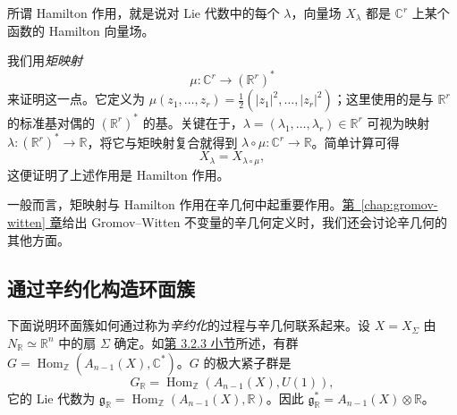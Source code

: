 所谓 Hamilton 作用，就是说对 Lie 代数中的每个 $\lambda$，向量场 $X_\lambda$ 都是 $\mathbb C^r$ 上某个函数的 Hamilton 向量场。

我们用\emph{矩映射}
\[
\mu:\mathbb C^r\longrightarrow(\mathbb R^r)^*
\]
来证明这一点。它定义为
$\mu(z_1,\ldots,z_r)=\tfrac12(|z_1|^2,\ldots,|z_r|^2)$；这里使用的是与 $\mathbb R^r$ 的标准基对偶的 $(\mathbb R^r)^*$ 的基。关键在于，$\lambda=(\lambda_1,\ldots,\lambda_r)\in\mathbb R^r$ 可视为映射 $\lambda:(\mathbb R^r)^*\to\mathbb R$，将它与矩映射复合就得到 $\lambda\circ\mu:\mathbb C^r\to\mathbb R$。简单计算可得
\[
X_\lambda=X_{\lambda\circ\mu},
\]
这便证明了上述作用是 Hamilton 作用。

一般而言，矩映射与 Hamilton 作用在辛几何中起重要作用。\hyperref[chap:gromov-witten]{第~\ref*{chap:gromov-witten} 章}给出 Gromov--Witten 不变量的辛几何定义时，我们还会讨论辛几何的其他方面。

\subsection{通过辛约化构造环面簇}\label{subsec:toric-reduction}

下面说明环面簇如何通过称为\emph{辛约化}的过程与辛几何联系起来。设 $X=X_\Sigma$ 由 $N_{\mathbb R}\simeq\mathbb R^n$ 中的扇 $\Sigma$ 确定。如\hyperref[subsec:toric-from-homogeneous]{第 3.2.3 小节}所述，有群 $G=\operatorname{Hom}_{\mathbb Z}(A_{n-1}(X),\mathbb C^*)$。$G$ 的极大紧子群是
\[
G_{\mathbb R}=\operatorname{Hom}_{\mathbb Z}(A_{n-1}(X),U(1)),
\]
它的 Lie 代数为 $\mathfrak g_{\mathbb R}=\operatorname{Hom}_{\mathbb Z}(A_{n-1}(X),\mathbb R)$。因此 $\mathfrak g_{\mathbb R}^*=A_{n-1}(X)\otimes\mathbb R$。

